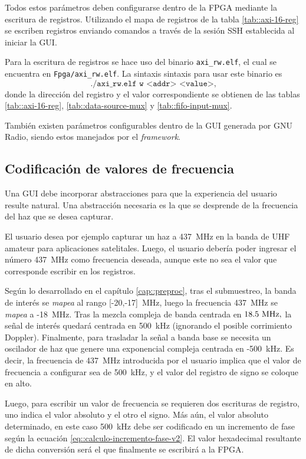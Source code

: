 \documentclass[../../main.tex]{subfiles}
\begin{document}
Todos estos parámetros deben configurarse dentro de la FPGA mediante la escritura de registros. Utilizando el mapa de registros de la tabla \ref{tab::axi-16-reg} se escriben registros enviando comandos a través de la sesión SSH establecida al iniciar la GUI.

Para la escritura de registros se hace uso del binario \texttt{axi\_rw.elf}, el cual se encuentra en \texttt{Fpga/axi\_rw.elf}. La sintaxis sintaxis para usar este binario es \[\texttt{./axi\_rw.elf w <addr> \ <value>,}\] donde la dirección del registro y el valor correspondiente se obtienen de las tablas \ref{tab::axi-16-reg}, \ref{tab::data-source-mux} y \ref{tab::fifo-input-mux}.

También existen parámetros configurables dentro de la GUI generada por GNU Radio, siendo estos manejados por el \textit{framework}.

\subsection{Codificación de valores de frecuencia}\label{subsec::codificacion-freq}
Una GUI debe incorporar abstracciones para que la experiencia del usuario resulte natural. Una abstracción necesaria es la que se desprende de la frecuencia del haz que se desea capturar.

El usuario desea por ejemplo capturar un haz a 437~MHz en la banda de UHF amateur para aplicaciones satelitales. Luego, el usuario debería poder ingresar el número 437~MHz como frecuencia deseada, aunque este no sea el valor que corresponde escribir en los registros.

Según lo desarrollado en el capítulo \ref{cap::preproc}, tras el submuestreo, la banda de interés se \textit{mapea} al rango [-20,-17]~MHz, luego la frecuencia 437~MHz se \textit{mapea} a -18~MHz. Tras la mezcla compleja de banda centrada en $18.5~\textrm{MHz},$ la señal de interés quedará centrada en 500~kHz (ignorando el posible corrimiento Doppler). Finalmente, para trasladar la señal a banda base se necesita un oscilador de haz que genere una exponencial compleja centrada en -500~kHz. Es decir, la frecuencia de 437~MHz introducida por el usuario implica que el valor de frecuencia a configurar sea de 500~kHz, y el valor del registro de signo se coloque en alto.

Luego, para escribir un valor de frecuencia se requieren dos escrituras de registro, uno indica el valor absoluto y el otro el signo. Más aún, el valor absoluto determinado, en este caso 500~kHz debe ser codificado en un incremento de fase según la ecuación \ref{eq::calculo-incremento-fase-v2}. El valor hexadecimal resultante de dicha conversión será el que finalmente se escribirá a la FPGA.
\end{document}
